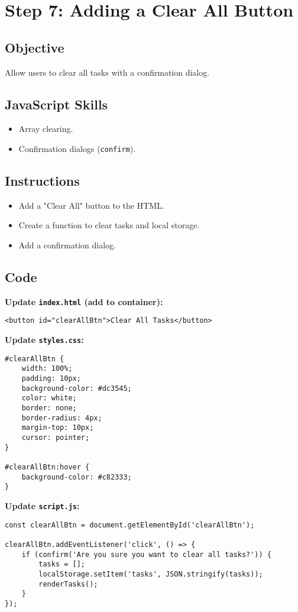 \documentclass[a4paper,12pt]{article}
\begin{document}
\section{Step 7: Adding a Clear All Button}
\subsection{Objective}
Allow users to clear all tasks with a confirmation dialog.

\subsection{JavaScript Skills}
\begin{itemize}
    \item Array clearing.
    \item Confirmation dialogs (\texttt{confirm}).
\end{itemize}

\subsection{Instructions}
\begin{itemize}
    \item Add a "Clear All" button to the HTML.
    \item Create a function to clear tasks and local storage.
    \item Add a confirmation dialog.
\end{itemize}

\subsection{Code}
\textbf{Update \texttt{index.html} (add to container):}
\lstset{language=HTML}
\begin{lstlisting}
<button id="clearAllBtn">Clear All Tasks</button>
\end{lstlisting}

\textbf{Update \texttt{styles.css}:}
\lstset{language=CSS}
\begin{lstlisting}
#clearAllBtn {
    width: 100%;
    padding: 10px;
    background-color: #dc3545;
    color: white;
    border: none;
    border-radius: 4px;
    margin-top: 10px;
    cursor: pointer;
}

#clearAllBtn:hover {
    background-color: #c82333;
}
\end{lstlisting}

\textbf{Update \texttt{script.js}:}
\lstset{language=JavaScript}
\begin{lstlisting}
const clearAllBtn = document.getElementById('clearAllBtn');

clearAllBtn.addEventListener('click', () => {
    if (confirm('Are you sure you want to clear all tasks?')) {
        tasks = [];
        localStorage.setItem('tasks', JSON.stringify(tasks));
        renderTasks();
    }
});
\end{lstlisting}
\end{document}
